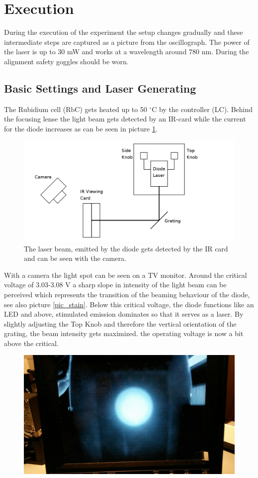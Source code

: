 \section{Execution}
During the execution of the experiment the setup changes gradually and these intermediate steps are captured as a picture from the oscillograph. The power
of the laser is up to 30 mW and works at a wavelength around 780 nm. During the alignment safety goggles should be worn.
\subsection{Basic Settings and Laser Generating}
The Rubidium cell (RbC) gets heated up to 50 $^\circ$C by the controller (LC). Behind the focusing lense the light beam gets detected by an IR-card while
the current for the diode increases as can be seen in picture \ref{pic_setup1}. 
\begin{figure}[t]
 \includegraphics[width=\textwidth]{../pics/setup1.png}
 \caption{The laser beam, emitted by the diode gets detected by the IR card and can be seen with the camera.}
 \label{pic_setup1}
\end{figure}
With a camera the light spot can be seen on a TV monitor. Around the critical
voltage of 3.03-3.08 V a sharp slope in intensity of the light beam can be perceived which represents the transition of the beaming behaviour of the diode,
see also picture \ref{pic_stain}.
Below this critical voltage, the diode functions like an LED and above, stimulated emission dominates so that it serves as a laser. By slightly adjusting
the Top Knob and therefore the vertical orientation of the grating, the beam intensity gets maximized. the operating voltage is now a bit above the critical.
\begin{figure}
 \includegraphics[]{../pics/bigstain.jpg}
\end{figure}


